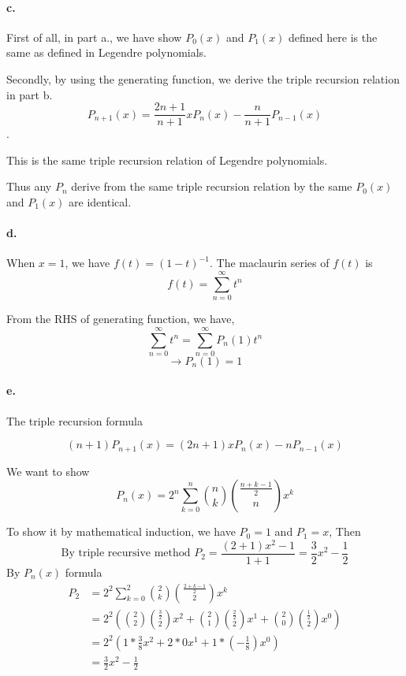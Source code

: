 \documentclass{article}
\begin{document}
\paragraph{c.}


First of all, in part a., we have show $P_0(x)$ and $P_1(x)$ defined here is the same as defined in Legendre polynomials.

Secondly, by using the generating function, we derive the triple recursion relation in part b.
$$ P_{n+1}(x)  =  \frac{2n+1}{n+1}xP_{n}(x) -\frac{n}{n+1} P_{n-1}(x) $$ .

This is the same triple recursion relation of Legendre polynomials.

Thus any $ P_{n} $ derive from the same triple recursion relation by the same $P_0(x)$ and $P_1(x)$ are identical.

\paragraph{d.}
When $x = 1$, we have $f(t) = (1 - t)^{-1}$.
The maclaurin series of $f(t)$ is
$$ f(t) = \sum^{\infty}_{n=0} t^n $$

From the RHS of generating function, we have,
$$ \sum^{\infty}_{n=0} t^n  =  \sum^{\infty}_{n=0} P_{n}(1) t^n $$
$$ \rightarrow P_{n}(1) = 1$$

\paragraph{e.}

The triple recursion formula

$$ (n+1) P_{n+1}(x) = (2n+1) x P_n (x) - n P_{n-1}(x) $$

We want to show
$$ P_n (x) = 2^n \sum_{k=0}^n \binom{n}{k} \binom{\frac{n+k-1}{2}}{n} x^k$$

To show it by mathematical induction, we have $ P_0 = 1 $ and $ P_1 = x$, Then
$$ \text{By triple recursive method }P_2  = \frac{(2+1)x^2 - 1 }{1+1} = \frac{3}{2} x^2 - \frac{1}{2} $$
By $P_n(x)$ formula
\begin{equation}
  \begin{split}
    P_2 &= 2^2 \sum_{k=0}^2 \binom{2}{k} \binom{\frac{2+k-1}{2}}{2} x^k \\
     &=  2^2 \left( \binom{2}{2} \binom{\frac{3}{2}}{2} x^2 + \binom{2}{1} \binom{\frac{2}{2}}{2} x^1 + \binom{2}{0} \binom{\frac{1}{2}}{2} x^0 \right)\\
     &=  2^2 \left( 1 * \frac{3}{8} x^2 + 2 *0 x^1 + 1 *(-\frac{1}{8}) x^0 \right)\\
     &=  \frac{3}{2} x^2 -\frac{1}{2} \\
  \end{split}
\end{equation}
\end{document}
